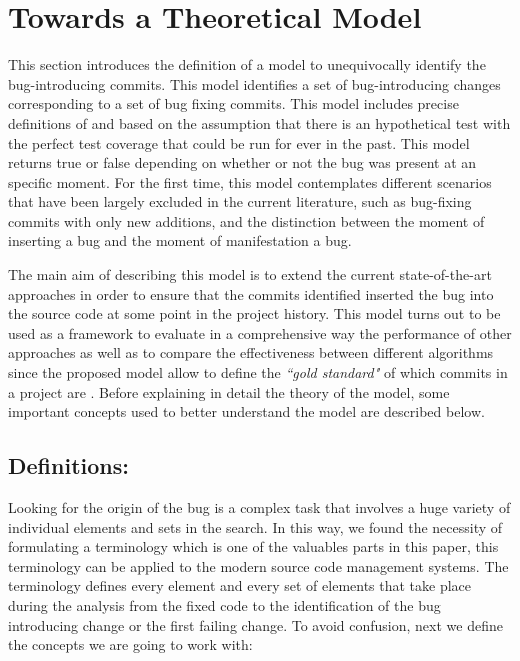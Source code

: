 \documentclass[a4paper, 12pt]{book}
\begin{document}
\section{Towards a Theoretical Model}

This section introduces the definition of a model to unequivocally identify the bug-introducing commits. This model identifies a set of bug-introducing changes corresponding to a set of bug fixing commits. This model includes precise definitions of \BFC and \BIC based on the assumption that there is an hypothetical test with the perfect test coverage that could be run for ever in the past. This model returns true or false depending on whether or not the bug was present at an specific moment. For the first time, this model contemplates different scenarios that have been largely excluded in the current literature, such as bug-fixing commits with only new additions, and the distinction between the moment of inserting a bug and the moment of manifestation a bug. 

The main aim of describing this model is to extend the current state-of-the-art approaches in order to ensure that the commits identified inserted the bug into the source code at some point in the project history. This model turns out to be used as a framework to evaluate in a comprehensive way the performance of other approaches as well as to compare the effectiveness between different algorithms since the proposed model allow to define the \emph{``gold standard"} of which commits in a project are \BIC.  Before explaining in detail the theory of the model, some important concepts used to better understand the model are described below.%

\subsection{Definitions:}

Looking for the origin of the bug is a complex task that involves a huge variety of individual elements and sets in the search. In this way, we found the necessity of formulating a terminology which is one of the valuables parts in this paper, this terminology can be applied to the modern source code management systems. The terminology defines every element and every set of elements that take place during the analysis from the fixed code to the identification of the bug introducing change or the first failing change. To avoid confusion, next we define the concepts we are going to work with:
\end{document}
